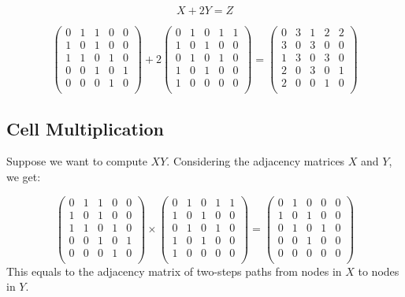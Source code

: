 \documentclass[
  notitlepage,
  onecolumn,
  openany]{book}
\begin{document}
\[
X+2Y = Z
\]

\[
\left(  
\begin{array}{ccccc}
0 & 1 & 1 & 0 & 0\\
1 & 0 & 1 & 0 & 0 \\
1 & 1 & 0 & 1 & 0 \\
0 & 0 & 1 & 0 & 1 \\
0 & 0 & 0 & 1 & 0 \\
\end{array}
\right)+2
\left(  
\begin{array}{ccccc}
0 & 1 & 0 & 1 & 1\\
1 & 0 & 1 & 0 & 0 \\
0 & 1 & 0 & 1 & 0 \\
1 & 0 & 1 & 0 & 0 \\
1 & 0 & 0 & 0 & 0 \\
\end{array}
\right) = 
\left(  
\begin{array}{ccccc}
0 & 3 & 1 & 2 & 2\\
3 & 0 & 3 & 0 & 0 \\
1 & 3 & 0 & 3 & 0 \\
2 & 0 & 3 & 0 & 1 \\
2 & 0 & 0 & 1 & 0 \\
\end{array}
\right)
\]

\hypertarget{cell-multiplication}{%
\subsection{Cell Multiplication}\label{cell-multiplication}}

Suppose we want to compute \(XY\). Considering the adjacency matrices \(X\) and \(Y\), we get:

\[
\left(  
\begin{array}{ccccc}
0 & 1 & 1 & 0 & 0\\
1 & 0 & 1 & 0 & 0 \\
1 & 1 & 0 & 1 & 0 \\
0 & 0 & 1 & 0 & 1 \\
0 & 0 & 0 & 1 & 0 \\
\end{array}
\right)\times
\left(  
\begin{array}{ccccc}
0 & 1 & 0 & 1 & 1\\
1 & 0 & 1 & 0 & 0 \\
0 & 1 & 0 & 1 & 0 \\
1 & 0 & 1 & 0 & 0 \\
1 & 0 & 0 & 0 & 0 \\
\end{array}
\right) = 
\left(  
\begin{array}{ccccc}
0 & 1 & 0 & 0 & 0\\
1 & 0 & 1 & 0 & 0 \\
0 & 1 & 0 & 1 & 0 \\
0 & 0 & 1 & 0 & 0 \\
0 & 0 & 0 & 0 & 0 \\
\end{array}
\right)
\]
This equals to the adjacency matrix of two-steps paths from nodes in \(X\) to nodes in \(Y\).
\end{document}

